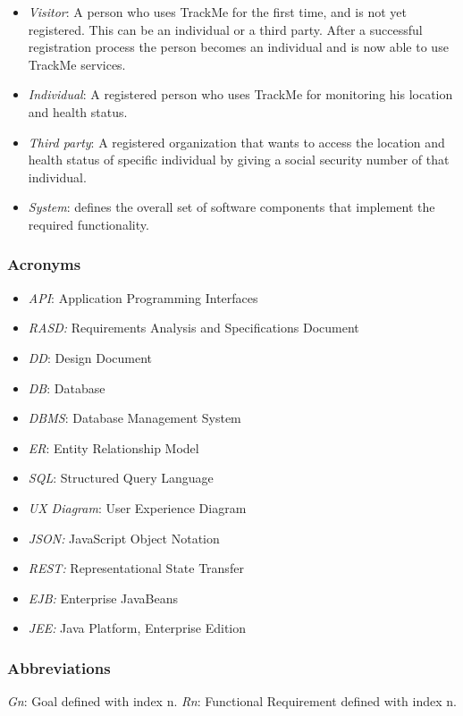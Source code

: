 \documentclass[12pt]{article}
\begin{document}
\begin{itemize}
\item \textit{Visitor}: A person who uses TrackMe for the first time, and is not yet registered. This can be an individual or a third party. After a successful registration process the person becomes an individual and is now able to use TrackMe services.
\item \textit{Individual}: A registered person who uses TrackMe for monitoring his location and health status.
\item \textit{Third party}: A registered organization that wants to access the location and health status of specific individual by giving a social security number of that individual.
\item \textit{System}: defines the overall set of software components that implement the required functionality.
\end{itemize}
\newpage 
\subsubsection{Acronyms}

\begin{itemize}
    \item \textit{API}: Application Programming Interfaces
    \item \textit{RASD:} Requirements Analysis and Specifications Document
    \item \textit{DD}: Design Document
    \item \textit{DB}: Database
    \item \textit{DBMS}: Database Management System
    \item \textit{ER}: Entity Relationship Model
    \item \textit{SQL}: Structured Query Language
    \item \textit{UX Diagram}: User Experience Diagram
    \item \textit{JSON:} JavaScript Object Notation
    \item \textit{REST:} Representational State Transfer
    \item \textit{EJB:} Enterprise JavaBeans
    \item \textit{JEE:} Java Platform, Enterprise Edition

\end{itemize}

\subsubsection{Abbreviations}
\textit{Gn}: Goal defined with index n.\newline
\textit{Rn}: Functional Requirement defined with index n.
\end{document}
